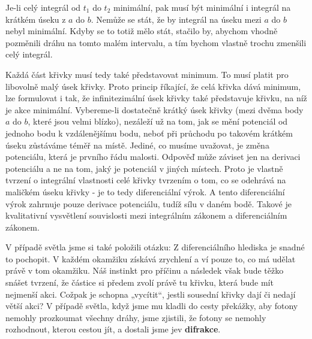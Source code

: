     Je-li celý integrál od \(t_1\) do \(t_2\) minimální, pak musí být minimální i integrál na
    krátkém úseku z \(a\) do \(b\). Nemůže se stát, že by integrál na úseku mezi \(a\) do \(b\)
    nebyl minimální. Kdyby se to totiž mělo stát, stačilo by, abychom vhodně pozměnili dráhu na
    tomto malém intervalu, a tím bychom vlastně trochu zmenšili celý integrál.

    Každá část křivky musí tedy také představovat minimum. To musí platit pro libovolně malý úsek
    křivky. Proto princip říkající, že celá křivka dává minimum, lze formulovat i tak, že
    infinitezimální úsek křivky také představuje křivku, na níž je akce minimální. Vybereme-li
    dostatečně krátký úsek křivky (mezi dvěma body \(a\) do \(b\), které jsou velmi blízko),
    nezáleží už na tom, jak se mění potenciál od jednoho bodu k vzdálenějšímu bodu, neboť při
    průchodu po takovém krátkém úseku zůstáváme téměř na místě. Jediné, co musíme uvažovat, je změna
    potenciálu, která je prvního řádu malosti. Odpověď může záviset jen na derivaci potenciálu a ne
    na tom, jaký je potenciál v jiných místech. Proto je vlastně tvrzení o integrální vlastnosti
    celé křivky tvrzením o tom, co se odehrává na maličkém úseku křivky - je to tedy diferenciální
    výrok. A tento diferenciální výrok zahrnuje pouze derivace potenciálu, tudíž sílu v daném bodě.
    Takové je kvalitativní vysvětlení souvislosti mezi integrálním zákonem a diferenciálním zákonem.
    
    V případě světla jsme si také položili otázku: \emph{} Z
    diferenciálního hlediska je snadné to pochopit. V každém okamžiku získává zrychlení a ví pouze
    to, co má udělat právě v tom okamžiku. Náš instinkt pro příčinu a následek však bude těžko
    snášet tvrzení, že částice si předem zvolí právě tu křivku, která bude mít nejmenší akci. Cožpak
    je schopna „vycítit“, jestli sousední křivky dají či nedají větší akci? V případě světla, když
    jsme mu kladli do cesty překážky, aby fotony nemohly prozkoumat všechny dráhy, jsme zjistili, že
    fotony se nemohly rozhodnout, kterou cestou jít, a dostali jsme jev \textbf{difrakce}. 
    
